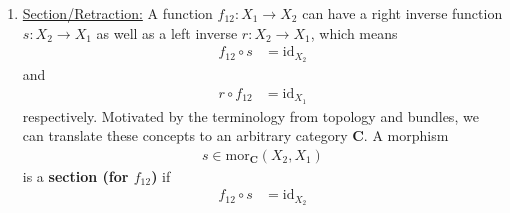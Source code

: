 \begin{exa}
\begin{enumerate}
\begin{align*}
  f
  \circ
  f_{1}
  =
  f
  \circ
  f_{2}
  \qquad
  &\Rightarrow
  \qquad
  f_{1}
  =
  f_{2}
\end{align*}
holds.
Dually, a morphism
\begin{align*}
  f
  &\in
  \mathrm{mor}_{\mathbf{C}}(X_{0},X)
\end{align*}
is an \textbf{epimorphism (in $\mathbf{C}$ from $X_{0}$ to $X$)} if for all $Y \in \mathrm{ob}_{\mathbf{C}}$ and all
\begin{align*}
  f_{1},
  f_{2}
  &\in
  \mathrm{mor}_{\mathbf{C}}(X,Y)
\end{align*}
the implication
\begin{align*}
  f_{1}
  \circ
  f
  =
  f_{2}
  \circ
  f
  \qquad
  &\Rightarrow
  \qquad
  f_{1}
  =
  f_{2}
\end{align*}
holds.
In a similar vein to monomorphisms, one can show that epimorphisms correspond to surjective functions.
Note that being a monomorphism and an epimorphism does not necessarily imply being an isomorphism.
However, it does hold in certain categories.\footnote{e.g., all topoi}
Furthermore, epimorphisms allow us to generalize the concept of {\glqq}non-empty{\grqq} to a category $\mathbf{C}$ with a terminal object.
To see this, note that a function from a set $X$ to a terminal set is surjective if and only if $X$ is not the empty set $\emptyset$.
So, in a category $\mathbf{C}$ with a terminal object we call an object $X$ \textbf{(internally) inhabited} if the unique arrow from $X$ to $1_{\mathbf{C}}$ is an epimorphism.
\item[$\bullet$]
\underline{Section/Retraction:}
A function $f_{12} \colon X_{1} \rightarrow X_{2}$ can have a right inverse function $s \colon X_{2} \rightarrow X_{1}$ as well as a left inverse $r \colon X_{2} \rightarrow X_{1}$, which means
\begin{align*}
  f_{12}
  \circ
  s
  &=
  \mathrm{id}_{X_{2}}
\end{align*}
and
\begin{align*}
  r
  \circ
  f_{12}
  &=
  \mathrm{id}_{X_{1}}
\end{align*}
respectively.
Motivated by the terminology from topology and bundles, we can translate these concepts to an arbitrary category $\mathbf{C}$.
A morphism
\begin{align*}
  s
  \in
  \mathrm{mor}_{\mathbf{C}}(X_{2},X_{1})
\end{align*}
is a \textbf{section (for $f_{12}$)} if
\begin{align*}
  f_{12}
  \circ
  s
  &=
  \mathrm{id}_{X_{2}}

\end{align*}
\end{enumerate}
\end{exa}
